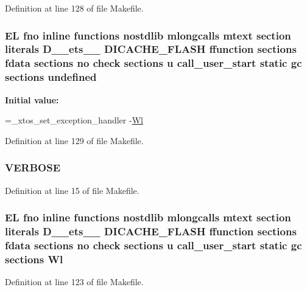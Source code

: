 Definition at line 128 of file Makefile.

\hypertarget{Makefile_a7caa220288c6621dffebfc3a50a851e1}{
\subsubsection[{undefined}]{\setlength{\rightskip}{0pt plus 5cm}E\-L fno inline functions nostdlib mlongcalls mtext section literals D\-\_\-\-\_\-ets\-\_\-\-\_\- D\-I\-C\-A\-C\-H\-E\-\_\-\-F\-L\-A\-S\-H ffunction sections fdata sections no check sections u call\-\_\-user\-\_\-start static gc sections undefined\hspace{0.3cm}{\ttfamily [static]}}}\label{Makefile_a7caa220288c6621dffebfc3a50a851e1}
{\bfseries Initial value\-:}
\begin{DoxyCode}
=\_xtos\_set\_exception\_handler 
    -\hyperlink{Makefile_a1af3a6ecef406b93f1a1db145b2cfd43}{Wl}
\end{DoxyCode}


Definition at line 129 of file Makefile.

\hypertarget{Makefile_a03169c2c7e2ff706233c78422b0daf3a}{
\subsubsection[{V\-E\-R\-B\-O\-S\-E}]{\setlength{\rightskip}{0pt plus 5cm}V\-E\-R\-B\-O\-S\-E}}\label{Makefile_a03169c2c7e2ff706233c78422b0daf3a}


Definition at line 15 of file Makefile.

\hypertarget{Makefile_a1af3a6ecef406b93f1a1db145b2cfd43}{
\subsubsection[{Wl}]{\setlength{\rightskip}{0pt plus 5cm}E\-L fno inline functions nostdlib mlongcalls mtext section literals D\-\_\-\-\_\-ets\-\_\-\-\_\- D\-I\-C\-A\-C\-H\-E\-\_\-\-F\-L\-A\-S\-H ffunction sections fdata sections no check sections u call\-\_\-user\-\_\-start static gc sections Wl}}\label{Makefile_a1af3a6ecef406b93f1a1db145b2cfd43}


Definition at line 123 of file Makefile.

